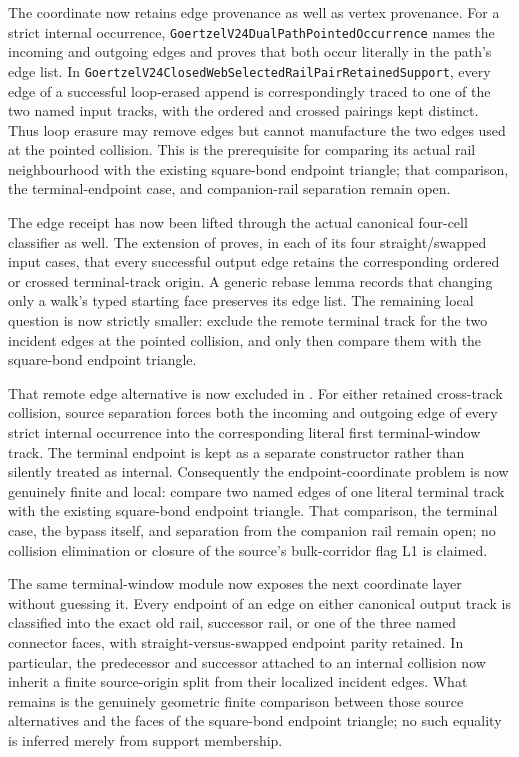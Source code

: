 \documentclass[11pt]{article}
\theoremstyle{definition}
\begin{document}
The coordinate now retains edge provenance as well as vertex provenance.
For a strict internal occurrence,
\texttt{GoertzelV24DualPathPointedOccurrence} names the incoming and outgoing
edges and proves that both occur literally in the path's edge list.  In
\texttt{GoertzelV24ClosedWebSelectedRailPairRetainedSupport}, every edge of a
successful loop-erased append is correspondingly traced to one of the two
named input tracks, with the ordered and crossed pairings kept distinct.
Thus loop erasure may remove edges but cannot manufacture the two edges used
at the pointed collision.  This is the prerequisite for comparing its actual
rail neighbourhood with the existing square-bond endpoint triangle; that
comparison, the terminal-endpoint case, and companion-rail separation remain
open.

The edge receipt has now been lifted through the actual canonical four-cell
classifier as well.  The extension of
proves, in each of its four straight/swapped input cases, that every successful
output edge retains the corresponding ordered or crossed terminal-track
origin.  A generic rebase lemma records that changing only a walk's typed
starting face preserves its edge list.  The remaining local question is now
strictly smaller: exclude the remote terminal track for the two incident
edges at the pointed collision, and only then compare them with the
square-bond endpoint triangle.

That remote edge alternative is now excluded in
.
For either retained cross-track collision, source separation forces both the
incoming and outgoing edge of every strict internal occurrence into the
corresponding literal first terminal-window track.  The terminal endpoint is
kept as a separate constructor rather than silently treated as internal.
Consequently the endpoint-coordinate problem is now genuinely finite and
local: compare two named edges of one literal terminal track with the existing
square-bond endpoint triangle.  That comparison, the terminal case, the
bypass itself, and separation from the companion rail remain open; no
collision elimination or closure of the source's bulk-corridor flag L1 is
claimed.

The same terminal-window module now exposes the next coordinate layer without
guessing it.  Every endpoint of an edge on either canonical output track is
classified into the exact old rail, successor rail, or one of the three named
connector faces, with straight-versus-swapped endpoint parity retained.  In
particular, the predecessor and successor attached to an internal collision
now inherit a finite source-origin split from their localized incident edges.
What remains is the genuinely geometric finite comparison between those
source alternatives and the faces of the square-bond endpoint triangle; no
such equality is inferred merely from support membership.
\end{document}
